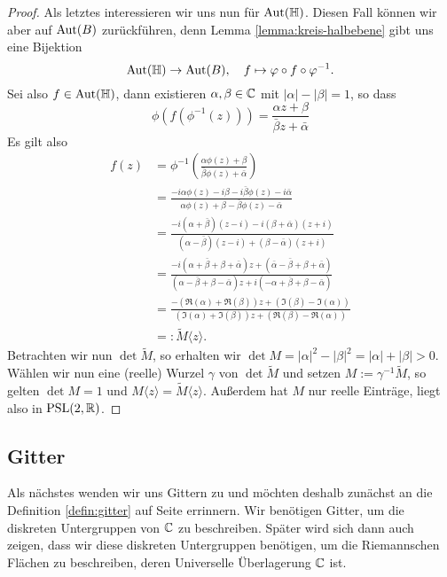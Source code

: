 \begin{proof}
  Als letztes interessieren wir uns nun für $\operatorname{Aut}(\mathbb{H})$. Diesen Fall
  können wir aber auf $\operatorname{Aut}(B)$ zurückführen, denn Lemma
  \ref{lemma:kreis-halbebene} gibt uns eine Bijektion
  \[
  \operatorname{Aut}(\mathbb{H}) \rightarrow \operatorname{Aut}(B), \quad f \mapsto \varphi \circ f \circ \varphi^{-1}.
  \]
  Sei also $f \in \operatorname{Aut}(\mathbb{H})$, dann existieren $\alpha, \beta \in \mathbb{C}$
  mit $|\alpha| - |\beta| = 1$, so dass
  \[
  \phi( f( \phi^{-1}(z))) = \frac{\alpha z + \beta}{\bar \beta z +
    \bar \alpha}
  \]
  Es gilt also
  \begin{align*}
    f(z) & = \phi^{-1} \left ( \frac{\alpha \phi(z) + \beta}{\bar
        \beta \phi(z) + \bar \alpha} \right ) \\
    & = \frac{-i \alpha \phi(z) - i \beta - i \bar \beta \phi(z) - i
      \bar \alpha}{\alpha \phi(z) + \beta - \bar \beta \phi(z) - \bar
      \alpha} \\
    & = \frac{-i (\alpha + \bar \beta)(z-i) -i (\beta + \bar
      \alpha)(z+i)}{(\alpha - \bar \beta)(z -i) + (\beta - \bar
      \alpha)(z+i)} \\
    & = \frac{-i ( \alpha + \bar \beta + \beta + \bar \alpha) z + (
      \bar \alpha - \bar \beta + \beta + \bar \alpha)}{(\alpha - \bar
      \beta + \beta - \bar \alpha)z + i (- \alpha + \bar \beta + \beta
      - \bar \alpha)} \\
    & = \frac{ - ( \Re(\alpha) + \Re(\beta)) z +  (\Im(\beta) -
      \Im(\alpha))}{(\Im(\alpha) + \Im(\beta))z + ( \Re(\beta) -
      \Re(\alpha))} \\
    & =: \tilde M\langle z \rangle.
  \end{align*}
  Betrachten wir nun $\det \tilde M$, so erhalten wir $\det M = |\alpha|^2 -
  |\beta|^2 = |\alpha| + |\beta| > 0$. Wählen wir nun eine (reelle)
  Wurzel $\gamma$ von $\det \tilde M$ und setzen $M := \gamma^{-1}
  \tilde M$, so gelten $\det M = 1$ und $M \langle z \rangle = \tilde M
  \langle z \rangle$. Außerdem hat $M$ nur reelle Einträge, liegt also
  in $\operatorname{PSL}(2, \mathbb{R})$.
\end{proof}

\subsection{Gitter}
\label{sec:gitter}

Als nächstes wenden wir uns Gittern zu und möchten deshalb zunächst an
die Definition \ref{defin:gitter} auf Seite \pageref{defin:gitter}
errinnern. Wir benötigen Gitter, um die
diskreten Untergruppen von $\mathbb{C}$ zu beschreiben. Später wird sich dann
auch zeigen, dass wir diese diskreten Untergruppen benötigen, um die
Riemannschen Flächen zu beschreiben, deren Universelle Überlagerung
$\mathbb{C}$ ist.


